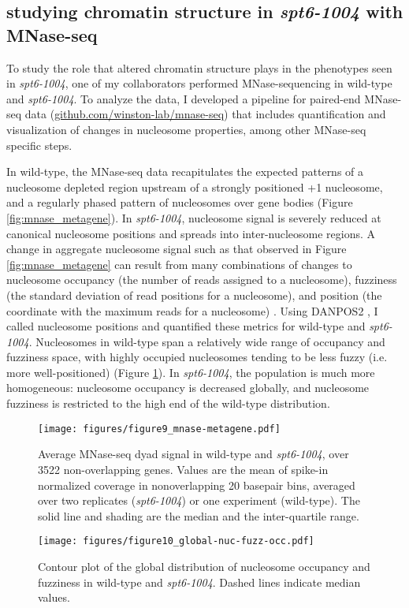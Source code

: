 \documentclass[9pt, letterpaper]{article}
\begin{document}
\subsection{studying chromatin structure in \textit{spt6-1004} with MNase-seq}

To study the role that altered chromatin structure plays in the phenotypes seen in \textit{spt6-1004}, one of my collaborators performed MNase-sequencing in wild-type and \textit{spt6-1004}. To analyze the data, I developed a pipeline for paired-end MNase-seq data (\href{https://github.com/winston-lab/mnase-seq}{github.com/winston-lab/mnase-seq}) that includes quantification and visualization of changes in nucleosome properties, among other MNase-seq specific steps.

In wild-type, the MNase-seq data recapitulates the expected patterns of a nucleosome depleted region upstream of a strongly positioned +1 nucleosome, and a regularly phased pattern of nucleosomes over gene bodies (Figure \ref{fig:mnase_metagene}). In \textit{spt6-1004}, nucleosome signal is severely reduced at canonical nucleosome positions and spreads into inter-nucleosome regions. A change in aggregate nucleosome signal such as that observed in Figure \ref{fig:mnase_metagene} can result from many combinations of changes to nucleosome occupancy (the number of reads assigned to a nucleosome), fuzziness (the standard deviation of read positions for a nucleosome), and position (the coordinate with the maximum reads for a nucleosome) \cite{chen2013}. Using DANPOS2 \cite{chen2013}, I called nucleosome positions and quantified these metrics for wild-type and \textit{spt6-1004}. Nucleosomes in wild-type span a relatively wide range of occupancy and fuzziness space, with highly occupied nucleosomes tending to be less fuzzy (i.e. more well-positioned) (Figure \ref{fig:global_nuc_fuzz}). In \textit{spt6-1004}, the population is much more homogeneous: nucleosome occupancy is decreased globally, and nucleosome fuzziness is restricted to the high end of the wild-type distribution.

\begin{figure}[h]
    \centering
    \begin{minipage}[t]{8.5cm}
        \centering
        \texttt{[image: figures/figure9\_mnase-metagene.pdf]}
        \caption{Average MNase-seq dyad signal in wild-type and \textit{spt6-1004}, over 3522 non-overlapping genes. Values are the mean of spike-in normalized coverage in nonoverlapping 20 basepair bins, averaged over two replicates (\textit{spt6-1004}) or one experiment (wild-type). The solid line and shading are the median and the inter-quartile range.}
        \label{fig:mnase_metagene}
    \end{minipage}\hfill
    \begin{minipage}[t]{8.5cm}
        \centering
        \texttt{[image: figures/figure10\_global-nuc-fuzz-occ.pdf]}
        \caption{Contour plot of the global distribution of nucleosome occupancy and fuzziness in wild-type and \textit{spt6-1004}. Dashed lines indicate median values.}
        \label{fig:global_nuc_fuzz}
    \end{minipage}
\end{figure}
\end{document}
